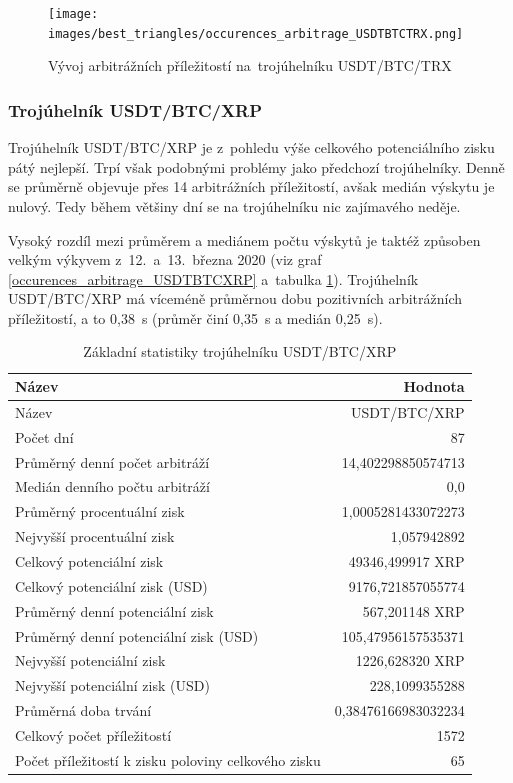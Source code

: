\documentclass[thesis=B,czech]{FITthesis}[2019/03/21]
\begin{document}
\begin{figure}\centering
	\texttt{[image: images/best\_triangles/occurences\_arbitrage\_USDTBTCTRX.png]}
	\caption{Vývoj arbitrážních příležitostí na~trojúhelníku USDT/BTC/TRX }\label{occurences_arbitrage_USDTBTCTRX}
\end{figure}


\subsubsection{Trojúhelník USDT/BTC/XRP}
Trojúhelník USDT/BTC/XRP je z~pohledu výše celkového potenciálního zisku pátý nejlepší. Trpí však podobnými problémy jako předchozí trojúhelníky. Denně se průměrně objevuje přes 14 arbitrážních příležitostí, avšak medián výskytu je nulový. Tedy během většiny dní se na trojúhelníku nic zajímavého neděje. 

Vysoký rozdíl mezi průměrem a mediánem počtu výskytů je taktéž způsoben velkým výkyvem z~12.~a~13.~března 2020 (viz graf \ref{occurences_arbitrage_USDTBTCXRP} a~tabulka \ref{USDTBTCXRP_stats}). Trojúhelník USDT/BTC/XRP má víceméně průměrnou dobu pozitivních arbitrážních příležitostí, a to 0,38~s (průměr činí 0,35~s a medián 0,25~s).

\begin{table}\centering
\caption{Základní statistiky trojúhelníku USDT/BTC/XRP}
\label{USDTBTCXRP_stats}
\begin{tabular}{|| l | r ||}
\hline Název & Hodnota \\ 
\hline\hline Název & USDT/BTC/XRP \\ 
\hline Počet dní & 87 \\ 
\hline Průměrný denní počet arbitráží & 14,402298850574713 \\ 
\hline Medián denního počtu arbitráží & 0,0 \\ 
\hline Průměrný procentuální zisk & 1,0005281433072273 \\ 
\hline Nejvyšší procentuální zisk & 1,057942892 \\ 
\hline Celkový potenciální zisk & 49346,499917 XRP \\ 
\hline Celkový potenciální zisk (USD) & 9176,721857055774 \\ 
\hline Průměrný denní potenciální zisk & 567,201148 XRP \\ 
\hline Průměrný denní potenciální zisk (USD) & 105,47956157535371 \\ 
\hline Nejvyšší potenciální zisk & 1226,628320 XRP \\ 
\hline Nejvyšší potenciální zisk (USD) & 228,1099355288 \\ 
\hline Průměrná doba trvání & 0,38476166983032234 \\ 
\hline Celkový počet příležitostí & 1572 \\ 
\hline Počet příležitostí k zisku poloviny celkového zisku & 65 \\ 
\hline
\end{tabular}
\end{table}
\end{document}
